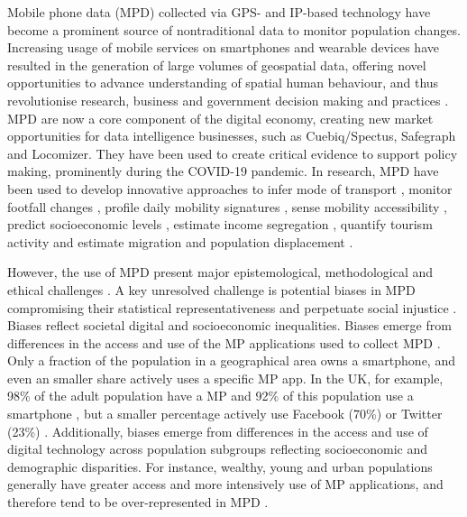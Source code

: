 \documentclass[]{rsos}%
\begin{document}
Mobile phone data (MPD) collected via GPS- and IP-based technology have
become a prominent source of nontraditional data to monitor population
changes. Increasing usage of mobile services on smartphones and wearable
devices have resulted in the generation of large volumes of geospatial
data, offering novel opportunities to advance understanding of spatial
human behaviour, and thus revolutionise research, business and
government decision making and practices \citep{rowe23-bigdata}. MPD are now
a core component of the digital economy, creating new market
opportunities for data intelligence businesses, such as Cuebiq/Spectus,
Safegraph and Locomizer. They have been used to create critical evidence
to support policy making, prominently during the COVID-19 pandemic. In
research, MPD have been used to develop innovative approaches to infer
mode of transport \citep{graells-garrido2023}, monitor footfall changes
\citep{ballantyne2022, hunter2021}, profile daily mobility signatures
\citep{cabrera-arnau2023}, sense mobility accessibility
\citep{graells-garrido2021}, predict socioeconomic levels \citep{soto2011, blumenstock2015}, estimate income segregation \citep{moro2021}, quantify
tourism activity \citep{raun2016} and estimate migration \citep{cepal24, gonzález-leonardo2025} and population displacement \citep{rowe2022, iradukunda2025, cabrera25}.

However, the use of MPD present major epistemological, methodological
and ethical challenges \citep{rowe23-bigdata}. A key unresolved challenge is
potential biases in MPD compromising their statistical
representativeness and perpetuate social injustice
\citep{wesolowski13-biases}. Biases reflect societal digital and
socioeconomic inequalities. Biases emerge from differences in the access
and use of the MP applications used to collect MPD
\citep{porter2012, wesolowski13-biases}. Only a fraction of the population
in a geographical area owns a smartphone, and even an smaller share
actively uses a specific MP app. In the UK, for example, 98\%
of the adult population have a MP and 92\% of this population
use a smartphone \citep{ofcom23}, but a smaller percentage actively use
Facebook (70\%) or Twitter (23\%) \citep{statista24}. Additionally, biases
emerge from differences in the access and use of digital technology
across population subgroups reflecting socioeconomic and demographic
disparities. For instance, wealthy, young and urban populations
generally have greater access and more intensively use of MP
applications, and therefore tend to be over-represented in MPD
\citep{blumenstock2010, wesolowski13-biases, schlosser21-biases}.
\end{document}
